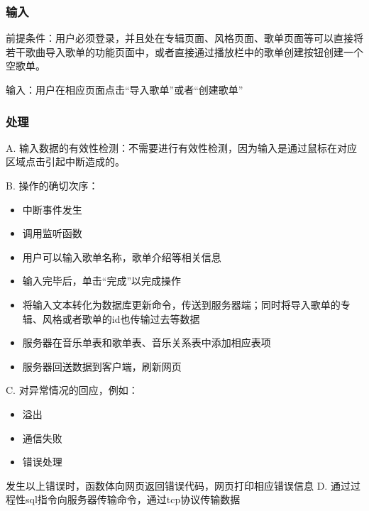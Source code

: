 			   \subsubsection{输入}
			   前提条件：用户必须登录，并且处在专辑页面、风格页面、歌单页面等可以直接将若干歌曲导入歌单的功能页面中，或者直接通过播放栏中的歌单创建按钮创建一个空歌单。
			
			   输入：用户在相应页面点击“导入歌单”或者“创建歌单”
			   
			   \subsubsection{处理}
			   
			
			   
			   A. 输入数据的有效性检测：不需要进行有效性检测，因为输入是通过鼠标在对应区域点击引起中断造成的。
			   
			   B. 操作的确切次序：
			   \begin{adjustwidth}{2cm}{1cm}\qquad
				   \begin{itemize}
					   \item 中断事件发生
					   \item 调用监听函数
					   \item 用户可以输入歌单名称，歌单介绍等相关信息
					   \item 输入完毕后，单击“完成”以完成操作
					   \item 将输入文本转化为数据库更新命令，传送到服务器端；同时将导入歌单的专辑、风格或者歌单的id也传输过去等数据
					   \item 服务器在音乐单表和歌单表、音乐关系表中添加相应表项
					   \item 服务器回送数据到客户端，刷新网页
				   \end{itemize}		
			   \end{adjustwidth}
				
			   
			   C. 对异常情况的回应，例如：
			   \begin{adjustwidth}{2cm}{1cm}\qquad
				   \begin{itemize}
					   \item 溢出
					   \item 通信失败
					   \item 错误处理
				   \end{itemize}		
			   \end{adjustwidth}
			   
				   发生以上错误时，函数体向网页返回错误代码，网页打印相应错误信息
			   D. 通过过程性sql指令向服务器传输命令，通过tcp协议传输数据
					   
